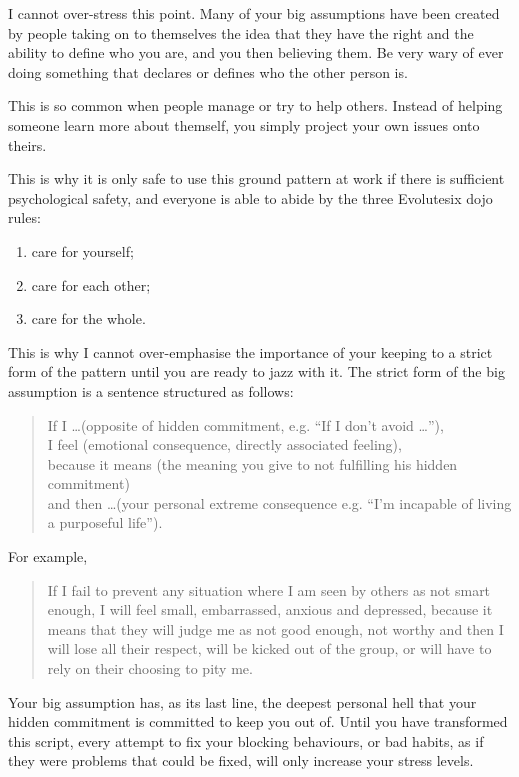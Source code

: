 I cannot over-stress this point. Many of your big assumptions have been created by people taking on to themselves the idea that they have the right and the ability to define who you are, and you then believing them. Be very wary of ever doing something that declares or defines who the other person is. 


This is so common when people manage or try to help others. Instead of helping someone learn more about themself, you simply project your own issues onto theirs. 


This is why it is only safe to use this ground pattern at work if there is sufficient psychological safety, and everyone is able to abide by the three Evolutesix dojo rules:


\begin{enumerate}
\item care for yourself;
\item care for each other;
\item care for the whole.
\end{enumerate}


This is why I cannot over-emphasise the importance of your keeping to a strict form of the pattern until you are ready to jazz with it. The strict form of the big assumption is a sentence structured as follows: 


\begin{quote} 
If I \ldots (opposite of hidden commitment, e.g. “If I don't avoid \ldots”), \\
I feel (emotional consequence, directly associated feeling), \\
because it means (the meaning you give to not fulfilling his hidden commitment) \\ 
and then \ldots (your personal extreme consequence e.g. “I'm incapable of living a purposeful life”).
\end{quote}


For example, 


\begin{quote}
If I fail to prevent any situation where I am seen by others as not smart enough, 
I will feel small, embarrassed, anxious and depressed, 
because it means that they will judge me as not good enough, not worthy
and then I will lose all their respect, will be kicked out of the group, or will have to rely on their choosing to pity me.
\end{quote}


Your big assumption has, as its last line, the deepest personal hell that your hidden commitment is committed to keep you out of. Until you have transformed this script, every attempt to fix your blocking behaviours, or bad habits, as if they were problems that could be fixed, will only increase your stress levels.


